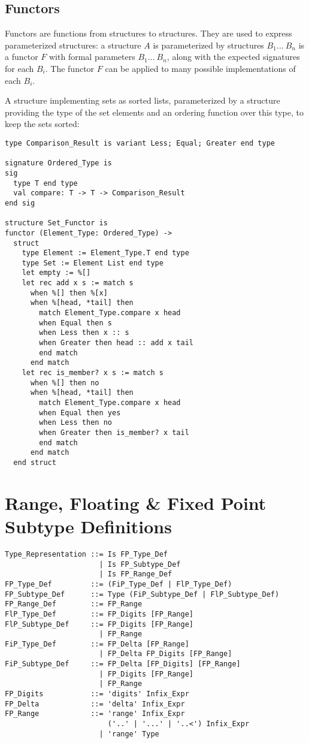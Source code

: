 \subsection{Functors}

Functors are functions from structures to structures. They are used to express parameterized structures: a structure $A$ is parameterized by structures $B_1 \ldots\ B_n$ is a functor $F$ with formal parameters $B_1 \ldots\ B_n$, along with the expected signatures for each $B_i$. The functor $F$ can be applied to many possible implementations of each $B_i$. 

\example A structure implementing sets as sorted lists, parameterized by a structure providing the type of the set elements and an ordering function over this type, to keep the sets sorted:
\begin{lstlisting}
type Comparison_Result is variant Less; Equal; Greater end type

signature Ordered_Type is
sig
  type T end type
  val compare: T -> T -> Comparison_Result
end sig

structure Set_Functor is
functor (Element_Type: Ordered_Type) ->
  struct
    type Element := Element_Type.T end type
    type Set := Element List end type
    let empty := %[]
    let rec add x s := match s
      when %[] then %[x]
      when %[head, *tail] then 
        match Element_Type.compare x head
        when Equal then s
        when Less then x :: s
        when Greater then head :: add x tail
        end match
      end match
    let rec is_member? x s := match s
      when %[] then no
      when %[head, *tail] then 
        match Element_Type.compare x head
        when Equal then yes
        when Less then no
        when Greater then is_member? x tail
        end match
      end match
  end struct
\end{lstlisting}





\section{Range, Floating \& Fixed Point Subtype Definitions}
\label{sec:fl-fi-subtypes}

\syntax\begin{lstlisting}
Type_Representation ::= Is FP_Type_Def 
                      | Is FP_Subtype_Def 
                      | Is FP_Range_Def
FP_Type_Def         ::= (FiP_Type_Def | FlP_Type_Def) 
FP_Subtype_Def      ::= Type (FiP_Subtype_Def | FlP_Subtype_Def) 
FP_Range_Def        ::= FP_Range
FlP_Type_Def        ::= FP_Digits [FP_Range]
FlP_Subtype_Def     ::= FP_Digits [FP_Range]
                      | FP_Range
FiP_Type_Def        ::= FP_Delta [FP_Range] 
                      | FP_Delta FP_Digits [FP_Range]
FiP_Subtype_Def     ::= FP_Delta [FP_Digits] [FP_Range]
                      | FP_Digits [FP_Range]
                      | FP_Range
FP_Digits           ::= 'digits' Infix_Expr
FP_Delta            ::= 'delta' Infix_Expr
FP_Range            ::= 'range' Infix_Expr 
                        ('..' | '...' | '..<') Infix_Expr
                      | 'range' Type
\end{lstlisting}

